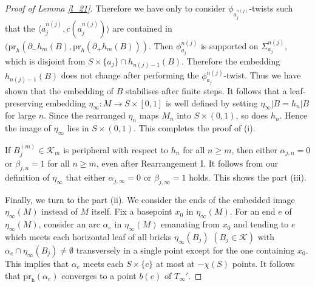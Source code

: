 \documentclass{amsart}
\theoremstyle{definition}
\numberwithin{figure}{section}
\numberwithin{equation}{section}
\newcommand{\pr}{\mathrm{pr}}
\def\ck{\mathcal{K}}
\def\eset{\emptyset}
\def\Sg{\Sigma}
\def\Sg{\Sigma}
\begin{document}
\begin{proof}[Proof of Lemma \ref{l_21}]
Therefore we have only to consider $\phi_{a_j^{n(j)}}$-twists such that the $\langle a_j^{n(j)}, c(a_j^{n(j)})\rangle$ are contained in $(\pr_h(\partial_- h_m(B), \pr_h(\partial_+ h_m(B)))$.
Then $\phi_{a_j}^{n(j)}$ is supported on $\Sg_{a_j}^{n(j)}$, which is disjoint from $S \times \{a_j\} \cap h_{n(j)-1}(B)$.
Therefore the embedding $h_{n(j)-1}(B)$ does not change after performing the $\phi_{a_j}^{n(j)}$-twist.
Thus we have shown that the embedding of $B$ stabilises after finite steps.
It follows that a leaf-preserving embedding $\eta_\infty:M \rightarrow S\times [0,1]$ is well defined by setting $\eta_\infty|B=h_{n}|B$ for large $n$.
 Since the rearranged $\eta_n$ maps $M_n$ into $S \times (0,1)$, so does $h_n$.
 Hence the image of $\eta_\infty$ lies in $S \times (0,1)$.
This completes the proof of (i).

If $B_j^{(m)}\in \ck_m$ is peripheral with respect to $h_n$ for all $n\geq m$, then 
either $\alpha_{j,n}=0$ or $\beta_{j,n}=1$ for all $n \geq m$, even after Rearrangement I.
It follows from our definition of $\eta_\infty$ that either $\alpha_{j,\infty}=0$ or $\beta_{j,\infty}=1$ holds.
This shows the part (iii).


Finally, we turn to the part (ii).
We consider the ends of the embedded image $\eta_\infty(M)$ instead of $M$ itself.
Fix a basepoint $x_0$ in $\eta_\infty(M)$.
For an end $e$ of $\eta_\infty(M)$, consider an arc $\alpha_e$ in $\eta_\infty(M)$ emanating from 
$x_0$ and tending to $e$ which meets each horizontal leaf of all bricks $\eta_\infty(B_j)$ $(B_j\in \ck)$ with $\alpha_e\cap \eta_\infty(B_j) \neq 
\eset$ transversely in a single point except for the one containing $x_0$.
This implies that $\alpha_e$ meets each $S \times \{c\}$ at most at $-\chi(S)$ points.
It follows that $\pr_{\mathrm{h}}(\alpha_e)$ converges to a point $b(e)$ of $T_\infty'$. 


\end{proof}
\end{document}
